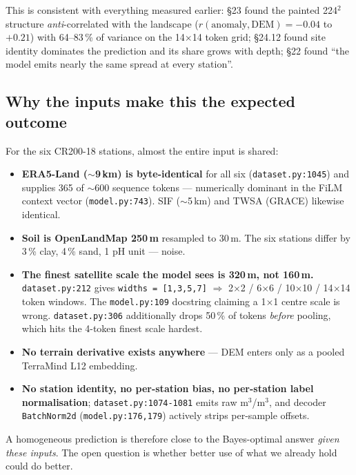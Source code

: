 \documentclass[11pt,a4paper]{article}
\begin{document}
This is consistent with everything measured earlier: \S23 found the painted 224$^2$
structure \emph{anti}-correlated with the landscape ($r(\text{anomaly},\text{DEM}) =
-0.04$ to $+0.21$) with 64--83\,\% of variance on the 14$\times$14 token grid;
\S24.12 found site identity dominates the prediction and its share grows with depth;
\S22 found ``the model emits nearly the same spread at every station''.

\subsection{Why the inputs make this the expected outcome}

For the six CR200-18 stations, almost the entire input is shared:

\begin{itemize}[nosep]
  \item \textbf{ERA5-Land ($\sim$9\,km) is byte-identical} for all six
        (\verb|dataset.py:1045|) and supplies 365 of $\sim$600 sequence tokens ---
        numerically dominant in the FiLM context vector (\verb|model.py:743|).
        SIF ($\sim$5\,km) and TWSA (GRACE) likewise identical.
  \item \textbf{Soil is OpenLandMap 250\,m} resampled to 30\,m. The six stations differ by
        3\,\% clay, 4\,\% sand, 1 pH unit --- noise.
  \item \textbf{The finest satellite scale the model sees is 320\,m, not 160\,m.}
        \verb|dataset.py:212| gives \verb|widths = [1,3,5,7]| $\Rightarrow$
        2$\times$2 / 6$\times$6 / 10$\times$10 / 14$\times$14 token windows. The
        \verb|model.py:109| docstring claiming a 1$\times$1 centre scale is wrong.
        \verb|dataset.py:306| additionally drops 50\,\% of tokens \emph{before} pooling,
        which hits the 4-token finest scale hardest.
  \item \textbf{No terrain derivative exists anywhere} --- DEM enters only as a pooled
        TerraMind L12 embedding.
  \item \textbf{No station identity, no per-station bias, no per-station label
        normalisation}; \verb|dataset.py:1074-1081| emits raw m$^3$/m$^3$, and decoder
        \verb|BatchNorm2d| (\verb|model.py:176,179|) actively strips per-sample offsets.
\end{itemize}

A homogeneous prediction is therefore close to the Bayes-optimal answer \emph{given these
inputs}. The open question is whether better use of what we already hold could do better.
\end{document}
